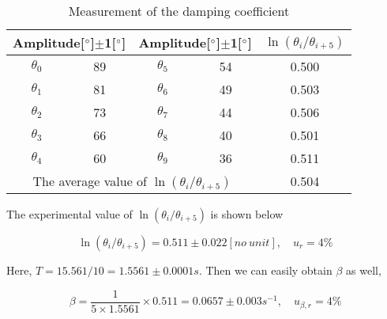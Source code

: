 \begin{table}[H] \small
\centering
\begin{tabular}{|c|c|c|c|c|}
\hline
\multicolumn{2}{|c}{Amplitude[$^\circ$]$\pm$1[$^\circ$]} & 
\multicolumn{2}{|c|}{Amplitude[$^\circ$]$\pm$1[$^\circ$]} &
$\ln(\theta_i/\theta_{i+5})$\\\hline
$\theta_0$ & 89 & $\theta_5$ & 54 & 0.500\\\hline
$\theta_1$ & 81 & $\theta_6$ & 49 & 0.503\\\hline
$\theta_2$ & 73 & $\theta_7$ & 44 & 0.506\\\hline
$\theta_3$ & 66 & $\theta_8$ & 40 & 0.501\\\hline
$\theta_4$ & 60 & $\theta_9$ & 36 & 0.511\\\hline
\multicolumn{4}{|c|}{The average value of $\ln(\theta_i/\theta_{i+5})$} & 0.504\\\hline
\end{tabular}
\caption{Measurement of the damping coefficient}\label{data_damping}
\end{table}

The experimental value of $\ln(\theta_i/\theta_{i+5})$ is shown below

\[
\ln(\theta_i/\theta_{i+5})=0.511\pm0.022 [no\ unit], \quad u_r=4\%
\]

Here, $T=15.561/10=1.5561\pm0.0001s$. Then we can easily obtain $\beta$ as well,

\[
\beta=\frac{1}{5\times1.5561}\times0.511=0.0657\pm 0.003s^{-1}, \quad u_{\beta,r}=4\%
\]

